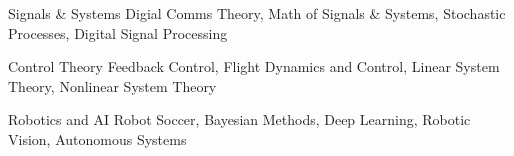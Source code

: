 

\begin{cvskills}

  \cvskill
    {Signals \& Systems} %
    {Digial Comms Theory, Math of Signals \& Systems, Stochastic Processes, Digital Signal Processing} %

  \cvskill
    {Control Theory} %
    {Feedback Control, Flight Dynamics and Control, Linear System Theory, Nonlinear System Theory} %

  \cvskill
    {Robotics and AI} %
    {Robot Soccer, Bayesian Methods, Deep Learning, Robotic Vision, Autonomous Systems} %

\end{cvskills}
